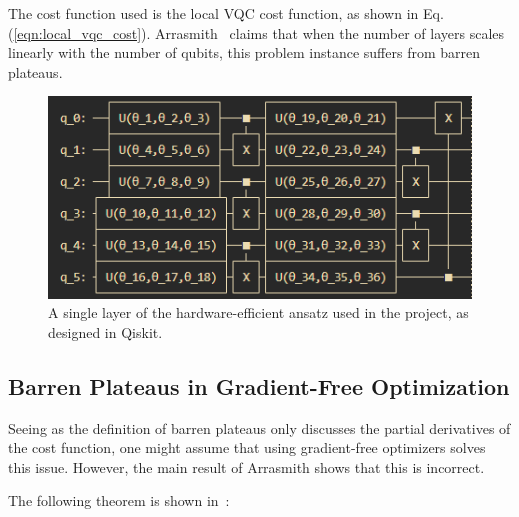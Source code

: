 \documentclass[a4paper,12pt]{article}
\begin{document}
The cost function used is the local VQC cost function, as shown in Eq. (\ref{eqn:local_vqc_cost}).
Arrasmith~\cite{arrasmith_effect_2021} claims that when the number of layers scales linearly with the number of qubits, this problem instance suffers from barren plateaus.

\begin{figure}[h]
    \centering
    \captionsetup{justification=centering, margin=1cm}
    \includegraphics{arrasmith_layer.png}
    \caption{A single layer of the hardware-efficient ansatz used in the project, as designed in Qiskit.}
    \label{fig:layer}
\end{figure}

\subsection{Barren Plateaus in Gradient-Free Optimization}
Seeing as the definition of barren plateaus only discusses the partial derivatives of the cost function, one might assume that using gradient-free optimizers solves this issue.
However, the main result of Arrasmith shows that this is incorrect.

The following theorem is shown in~\cite{arrasmith_effect_2021}:
\end{document}
